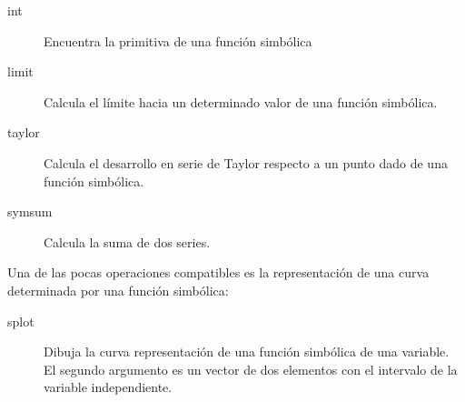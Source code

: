\begin{description}
\item [int]Encuentra la primitiva de una función simbólica
\item [limit]Calcula el límite hacia un determinado valor
de una función simbólica.
\item [taylor]Calcula el desarrollo en serie de Taylor respecto
a un punto dado de una función simbólica.
\item [symsum]Calcula la suma de dos series.
\end{description}
Una de las pocas operaciones compatibles es la representación de una
curva determinada por una función simbólica:

\begin{description}
\item [splot]Dibuja la curva representación de una función
simbólica de una variable. El segundo argumento es un vector de dos
elementos con el intervalo de la variable independiente.
\end{description}
  \begin{verbatim}

 \end{verbatim}
